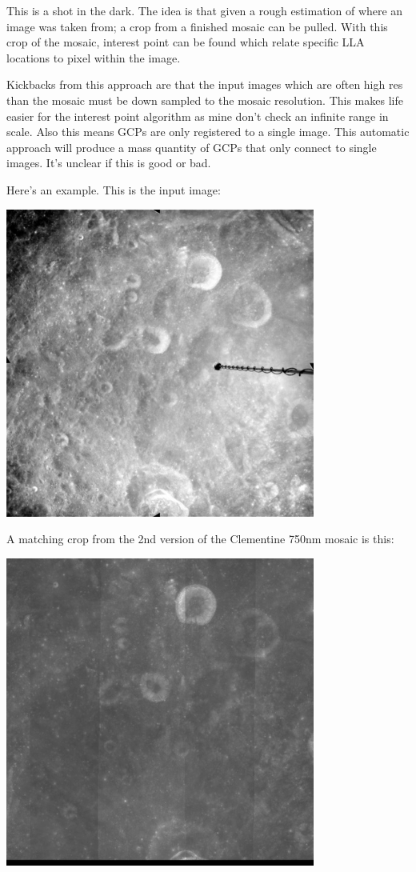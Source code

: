 \documentclass[12pt]{article}
\begin{document}
This is a shot in the dark. The idea is that given a rough estimation
of where an image was taken from; a crop from a finished mosaic can be
pulled. With this crop of the mosaic, interest point can be found
which relate specific LLA locations to pixel within the
image.

Kickbacks from this approach are that the input images which are often
high res than the mosaic must be down sampled to the mosaic
resolution. This makes life easier for the interest point algorithm as
mine don't check an infinite range in scale. Also this means GCPs are
only registered to a single image. This automatic approach will
produce a mass quantity of GCPs that only connect to single
images. It's unclear if this is good or bad.

Here's an example. This is the input image:

\includegraphics[width=4in]{images/AS16-M-1192.jpg}

A matching crop from the 2nd version of the Clementine 750nm mosaic is this:

\includegraphics[width=4in]{images/AS16-M-1192_clem.jpg}
\end{document}
